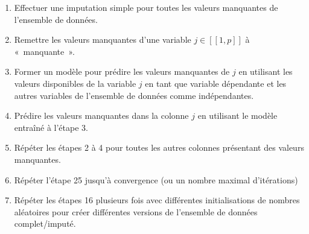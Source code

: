 \documentclass[letterpaper,10pt,french]{sphinxmanual}
\begin{document}
\begin{enumerate}
%
\item {} 
\sphinxAtStartPar
Effectuer une imputation simple pour toutes les valeurs manquantes de l’ensemble de données.

\item {} 
\sphinxAtStartPar
Remettre les valeurs manquantes d’une variable \(j\in[\![1,p]\!]\) à « manquante ».

\item {} 
\sphinxAtStartPar
Former un modèle pour prédire les valeurs manquantes de \(j\) en utilisant les valeurs disponibles de la variable \(j\) en tant que variable dépendante et les autres variables de l’ensemble de données comme indépendantes.

\item {} 
\sphinxAtStartPar
Prédire les valeurs manquantes dans la colonne \(j\) en utilisant le modèle entraîné à l’étape 3.

\item {} 
\sphinxAtStartPar
Répéter les étapes 2 à 4 pour toutes les autres colonnes présentant des valeurs manquantes.

\item {} 
\sphinxAtStartPar
Répéter l’étape 2\sphinxhyphen{}5 jusqu’à convergence (ou un nombre maximal d’itérations)

\item {} 
\sphinxAtStartPar
Répéter les étapes 1\sphinxhyphen{}6 plusieurs fois avec différentes initialisations de nombres aléatoires pour créer différentes versions de l’ensemble de données complet/imputé.

\end{enumerate}
\end{document}
